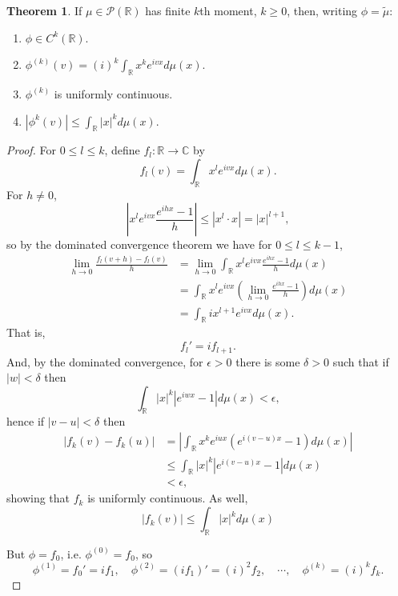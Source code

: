 \documentclass{article}
\theoremstyle{definition}
\newtheorem{theorem}{Theorem}
\theoremstyle{definition}
\begin{document}
\begin{theorem}
If $\mu \in \mathscr{P}(\mathbb{R})$ has finite $k$th moment, $k \geq 0$, then, writing $\phi=\tilde{\mu}$:
\begin{enumerate}
\item $\phi \in C^k(\mathbb{R})$. 
\item $\phi^{(k)}(v) = (i)^k \int_\mathbb{R} x^k e^{ivx} d\mu(x)$.
\item $\phi^{(k)}$ is uniformly continuous.
\item $|\phi^k(v)| \leq \int_\mathbb{R} |x|^k d\mu(x)$.
\end{enumerate}
\label{characteristic}
\end{theorem}
\begin{proof}
For $0 \leq l \leq k$, define $f_l:\mathbb{R} \to \mathbb{C}$ by
\[
f_l(v) = \int_\mathbb{R} x^l e^{ivx} d\mu(x).
\]
For $h \neq 0$,
\[
\left| x^l e^{ivx} \frac{e^{ihx}-1}{h} \right| \leq |x^l \cdot x| = |x|^{l+1},
\]
so by the dominated convergence theorem we have for $0 \leq l \leq k-1$,
\begin{align*}
\lim_{h \to 0} \frac{f_l(v+h)-f_l(v)}{h}&=\lim_{h \to 0} \int_\mathbb{R} x^l e^{ivx} \frac{e^{ihx}-1}{h} d\mu(x)\\
&=\int_\mathbb{R}   x^l e^{ivx} \left(\lim_{h \to 0} \frac{e^{ihx}-1}{h}\right) d\mu(x)\\
&=\int_\mathbb{R} i x^{l+1} e^{ivx} d\mu(x).
\end{align*}
That is,
\[
f_l' = i f_{l+1}.
\]
And, by the dominated convergence, for $\epsilon>0$ there is some
$\delta>0$ such that if $|w|<\delta$ then
\[
\int_\mathbb{R} |x|^k |e^{iwx}-1| d\mu(x)<\epsilon,
\]
hence if $|v-u|<\delta$ then
\begin{align*}
|f_k(v)-f_k(u)| &= \left| \int_\mathbb{R} x^k e^{iux}(e^{i(v-u)x}-1) d\mu(x)\right|\\
&\leq \int_\mathbb{R} |x|^k |e^{i(v-u)x}-1| d\mu(x)\\
&<\epsilon, 
\end{align*}
showing that $f_k$ is uniformly continuous.
As well, 
\[
|f_k(v)| \leq \int_\mathbb{R} |x|^k d\mu(x)
\]

But $\phi = f_0$, i.e. $\phi^{(0)}=f_0$, so
\[
\phi^{(1)} = f_0'=if_1, \quad \phi^{(2)}=(if_1)'=(i)^2 f_2,\quad
\cdots, \quad \phi^{(k)}=(i)^k f_k.
\]
\end{proof}
\end{document}
